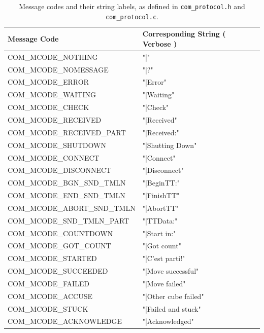 \begin{table}[ht]
\begin{center}
\caption{Message codes and their string labels, as defined in \texttt{com\_protocol.h} and \texttt{com\_protocol.c}.}\vspace{1ex}
\label{tab:mcodes}
\begin{tabular}{ll}\hline
Message Code & Corresponding String ( Verbose ) \\ \hline 
COM\_MCODE\_NOTHING             & "|"                  \\
COM\_MCODE\_NOMESSAGE           & "|?"                 \\
COM\_MCODE\_ERROR               & "|Error"             \\
COM\_MCODE\_WAITING             & "|Waiting"           \\
COM\_MCODE\_CHECK               & "|Check"             \\
COM\_MCODE\_RECEIVED            & "|Received"          \\
COM\_MCODE\_RECEIVED\_PART      & "|Received:"         \\
COM\_MCODE\_SHUTDOWN            & "|Shutting Down"     \\
COM\_MCODE\_CONNECT             & "|Connect"           \\
COM\_MCODE\_DISCONNECT          & "|Disconnect"        \\
COM\_MCODE\_BGN\_SND\_TMLN      & "|BeginTT:"          \\
COM\_MCODE\_END\_SND\_TMLN      & "|FinishTT"          \\
COM\_MCODE\_ABORT\_SND\_TMLN    & "|AbortTT"           \\
COM\_MCODE\_SND\_TMLN\_PART     & "|TTData:"           \\
COM\_MCODE\_COUNTDOWN           & "|Start in:"         \\
COM\_MCODE\_GOT\_COUNT          & "|Got count"         \\
COM\_MCODE\_STARTED             & "|C'est parti!"      \\
COM\_MCODE\_SUCCEEDED           & "|Move successful"   \\
COM\_MCODE\_FAILED              & "|Move failed"       \\
COM\_MCODE\_ACCUSE              & "|Other cube failed" \\
COM\_MCODE\_STUCK               & "|Failed and stuck"  \\
COM\_MCODE\_ACKNOWLEDGE         & "|Acknowledged"      \\

\end{tabular}
\end{center}
\end{table}

